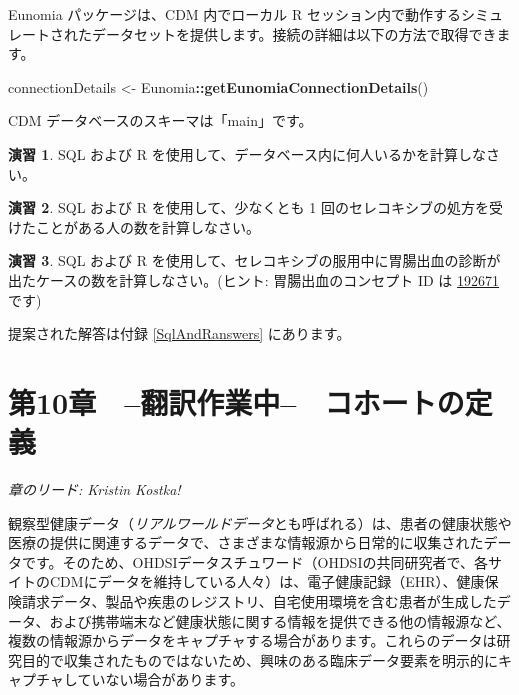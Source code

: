 \documentclass[
  11pt]{book}
\newenvironment{Shaded}{\begin{snugshade}}{\end{snugshade}}
\newcommand{\FunctionTok}[1]{\textcolor[rgb]{0.13,0.29,0.53}{\textbf{#1}}}
\newcommand{\NormalTok}[1]{#1}
\newcommand{\OtherTok}[1]{\textcolor[rgb]{0.56,0.35,0.01}{#1}}
\newcommand{\SpecialCharTok}[1]{\textcolor[rgb]{0.81,0.36,0.00}{\textbf{#1}}}
\theoremstyle{definition}
\theoremstyle{definition}
\theoremstyle{definition}
\newtheorem{exercise}{演習}[chapter]
\theoremstyle{definition}
\theoremstyle{remark}
\begin{document}
Eunomia パッケージは、CDM 内でローカル R セッション内で動作するシミュレートされたデータセットを提供します。接続の詳細は以下の方法で取得できます。

\begin{Shaded}
\begin{Highlighting}[]
\NormalTok{connectionDetails }\OtherTok{\textless{}{-}}\NormalTok{ Eunomia}\SpecialCharTok{::}\FunctionTok{getEunomiaConnectionDetails}\NormalTok{()}
\end{Highlighting}
\end{Shaded}

CDM データベースのスキーマは「main」です。

\begin{exercise}
\protect\hypertarget{exr:exercisePeopleCount}{}\label{exr:exercisePeopleCount}SQL および R を使用して、データベース内に何人いるかを計算しなさい。
\end{exercise}

\begin{exercise}
\protect\hypertarget{exr:exerciseCelecoxibUsers}{}\label{exr:exerciseCelecoxibUsers}SQL および R を使用して、少なくとも 1 回のセレコキシブの処方を受けたことがある人の数を計算しなさい。
\end{exercise}

\begin{exercise}
\protect\hypertarget{exr:exerciseGiBleedsDuringCelecoxib}{}\label{exr:exerciseGiBleedsDuringCelecoxib}SQL および R を使用して、セレコキシブの服用中に胃腸出血の診断が出たケースの数を計算しなさい。(ヒント: 胃腸出血のコンセプト ID は \href{http://athena.ohdsi.org/search-terms/terms/192671}{192671} です)
\end{exercise}

提案された解答は付録 \ref{SqlAndRanswers} にあります。

\chapter{第10章　--翻訳作業中--　コホートの定義}\label{Cohorts}

\emph{章のリード: Kristin Kostka!}

観察型健康データ（\emph{リアルワールドデータ}とも呼ばれる）は、患者の健康状態や医療の提供に関連するデータで、さまざまな情報源から日常的に収集されたデータです。そのため、OHDSIデータスチュワード（OHDSIの共同研究者で、各サイトのCDMにデータを維持している人々）は、電子健康記録（EHR）、健康保険請求データ、製品や疾患のレジストリ、自宅使用環境を含む患者が生成したデータ、および携帯端末など健康状態に関する情報を提供できる他の情報源など、複数の情報源からデータをキャプチャする場合があります。これらのデータは研究目的で収集されたものではないため、興味のある臨床データ要素を明示的にキャプチャしていない場合があります。
\end{document}
